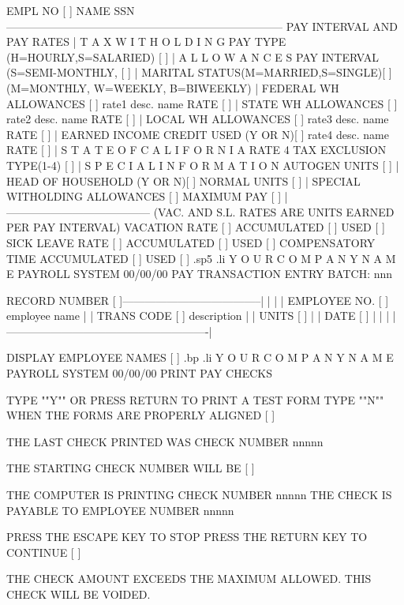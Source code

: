  EMPL NO [     ]   NAME 				   SSN
---------------------------------------------------------------------------
   PAY INTERVAL  AND  PAY RATES    |	    T A X   W I T H O L D I N G
PAY TYPE (H=HOURLY,S=SALARIED) [ ] |		A L L O W A N C E S
PAY INTERVAL (S=SEMI-MONTHLY,  [ ] |  MARITAL STATUS(M=MARRIED,S=SINGLE)[ ]
(M=MONTHLY, W=WEEKLY, B=BIWEEKLY)  |	      FEDERAL  WH  ALLOWANCES  [  ]
rate1 desc. name  RATE [	 ] |	      STATE    WH  ALLOWANCES  [  ]
rate2 desc. name  RATE [	 ] |	      LOCAL    WH  ALLOWANCES  [  ]
rate3 desc. name  RATE [	 ] |  EARNED INCOME CREDIT USED (Y OR N)[ ]
rate4 desc. name  RATE [	 ] |  S T A T E   O F	C A L I F O R N I A
RATE 4 TAX EXCLUSION TYPE(1-4) [ ] |  S P E C I A L   I N F O R M A T I O N
AUTOGEN UNITS	       [	 ] |  HEAD OF HOUSEHOLD 	(Y OR N)[ ]
NORMAL UNITS	       [	 ] |  SPECIAL  WITHOLDING ALLOWANCES   [  ]
MAXIMUM PAY	      [ 	 ] |---------------------------------------
     (VAC. AND S.L.  RATES ARE UNITS EARNED PER PAY INTERVAL)
   VACATION	RATE   [	 ] ACCUMULATED [	 ] USED [	  ]
   SICK LEAVE	RATE   [	 ] ACCUMULATED [	 ] USED [	  ]
   COMPENSATORY TIME		   ACCUMULATED [	 ] USED [	  ]
.sp5
.li
		     Y O U R	C O M P A N Y	 N A M E
			       PAYROLL SYSTEM
  00/00/00		    PAY TRANSACTION ENTRY		  BATCH: nnn





	   RECORD NUMBER [    ]--------------------------------------|
	     |							     |
	     |	EMPLOYEE NO.  [     ]  employee name		     |
	     |	TRANS CODE    [  ]     description		     |
	     |	UNITS	      [ 	   ]			     |
	     |	DATE	      [        ]			     |
	     |							     |
	     |-------------------------------------------------------|

			   DISPLAY EMPLOYEE NAMES [ ]
.bp
.li
		      Y O U R	C O M P A N Y	N A M E
			       PAYROLL SYSTEM
  00/00/00		      PRINT PAY CHECKS


	       TYPE ""Y"" OR PRESS  RETURN  TO PRINT A TEST FORM
	       TYPE ""N"" WHEN THE FORMS ARE PROPERLY ALIGNED [ ]

	       THE LAST CHECK PRINTED WAS CHECK NUMBER	 nnnnn

	       THE STARTING CHECK NUMBER WILL BE	[     ]

	       THE COMPUTER IS PRINTING CHECK NUMBER	 nnnnn
	       THE CHECK IS PAYABLE TO EMPLOYEE NUMBER	 nnnnn

		    PRESS THE ESCAPE KEY TO STOP
		    PRESS THE RETURN KEY TO CONTINUE   [ ]

	       THE CHECK AMOUNT EXCEEDS THE MAXIMUM ALLOWED.
			 THIS CHECK WILL BE VOIDED.

